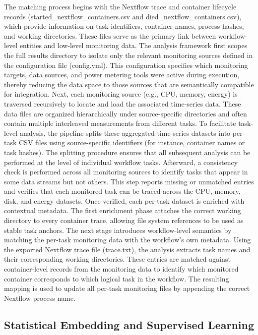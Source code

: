 The matching process begins with the Nextflow trace and container lifecycle records (started_nextflow_containers.csv and died_nextflow_containers.csv), which provide information on task identifiers, container names, process hashes, and working directories. These files serve as the primary link between workflow-level entities and low-level monitoring data. The analysis framework first scopes the full results directory to isolate only the relevant monitoring sources defined in the configuration file (config.yml). This configuration specifies which monitoring targets, data sources, and power metering tools were active during execution, thereby reducing the data space to those sources that are semantically compatible for integration.
Next, each monitoring source (e.g., CPU, memory, energy) is traversed recursively to locate and load the associated time-series data. These data files are organized hierarchically under source-specific directories and often contain multiple interleaved measurements from different tasks. To facilitate task-level analysis, the pipeline splits these aggregated time-series datasets into per-task CSV files using source-specific identifiers (for instance, container names or task hashes). The splitting procedure ensures that all subsequent analysis can be performed at the level of individual workflow tasks.
Afterward, a consistency check is performed across all monitoring sources to identify tasks that appear in some data streams but not others. This step reports missing or unmatched entries and verifies that each monitored task can be traced across the CPU, memory, disk, and energy datasets. Once verified, each per-task dataset is enriched with contextual metadata. The first enrichment phase attaches the correct working directory to every container trace, allowing file system references to be used as stable task anchors.
The next stage introduces workflow-level semantics by matching the per-task monitoring data with the workflow’s own metadata. Using the exported Nextflow trace file (trace.txt), the analysis extracts task names and their corresponding working directories. These entries are matched against container-level records from the monitoring data to identify which monitored container corresponds to which logical task in the workflow. The resulting mapping is used to update all per-task monitoring files by appending the correct Nextflow process name.

\subsection{Statistical Embedding and Supervised Learning}
\label{sec:statistical_embedding_and_supervised_learning}
